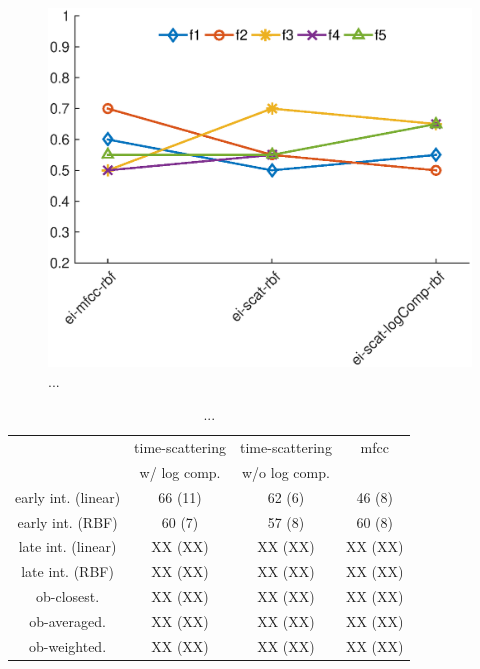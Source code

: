 \documentclass[journal]{IEEEtran}
\begin{document}
\begin{figure}
\begin{center}
\includegraphics[width=\columnwidth]{gfx/supervised_rbf_test2.eps}
\caption{...}
\end{center}
\end{figure}

\begin{table}
\begin{center}
\begin{tabular}{cccc}
                    & time-scattering & time-scattering & mfcc \\
                    & w/ log comp.    & w/o log comp.   &      \\
             \hline
early int. (linear)  & 66 (11)        & 62 (6)  & 46 (8)    \\
early int. (RBF)     & 60 (7)         & 57 (8)  & 60 (8)    \\
late int.  (linear)  & XX (XX)        & XX (XX) & XX (XX)   \\
late int.  (RBF)     & XX (XX)        & XX (XX) & XX (XX)   \\
ob-closest.          & XX (XX)        & XX (XX) & XX (XX)   \\
ob-averaged.         & XX (XX)        & XX (XX) & XX (XX)   \\
ob-weighted.         & XX (XX)        & XX (XX) & XX (XX)   \\
\end{tabular}
\caption{...}
\end{center}
\end{table}
\end{document}
